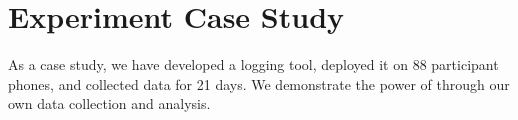 \section{Experiment Case Study}
\label{sec-experiment}

As a case study, we have developed a logging tool, deployed it on 88 participant
phones, and collected data for 21 days. 
We demonstrate the power of \PhoneLab{} through our own data collection and
analysis. 
